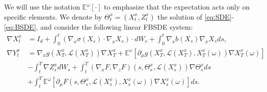 \documentclass[12,english]{amsart}
\theoremstyle{plain}
\theoremstyle{definition}
\theoremstyle{plain}
\theoremstyle{plain}
\theoremstyle{remark}
\newcommand{\E}{\mathbb E}
\newcommand{\cL}{\mathcal L}
\newcommand{\om}{\omega}
\newcommand{\Te}{\Theta}
\newcommand{\si}{\sigma}
\begin{document}
We will use the notation $\mathbb{E}^{\omega}\left[\cdot\right]$
to emphasize that the expectation acts only on specific elements.
We denote by $\Theta^x_t=(X^x_t,Z^x_t)$ the solution of \eqref{eq:SDE}- \eqref{eq:BSDE},  and consider the following linear FBSDE system: 
\begin{align}\label{derX}
  \nabla X^x_t&=I_d+\int_0^t(\nabla_x\si(X_s)\cdot\nabla_xX_s)\cdot dW_s+\int_0^t\nabla_xb(X_s)\nabla_xX_sds,\\
  \label{derY}
\nabla Y^x_t&=\nabla_xg(X^x_T,\cL(X^x_T)) \nabla X^x_T+\E^\om[\partial_\mu g(X^x_T,\cL(X^x_T), X^x_T(\om))\nabla X^x_T(\om)]\\\nonumber
       &-\int_t^T\nabla Z^x_s dW_s+\int_t^T(\nabla_xF,\nabla_zF)(s,\Te^x_s,\cL(X^x_s)) \nabla\Te^x_sds\\
   \nonumber           \ &+\int_t^T\E^\om[\partial_\mu F(s,\Te^x_s,\cL(X^x_s), X^x_s(\om))\nabla X^x_s(\om)]ds.
\end{align}
\end{document}
